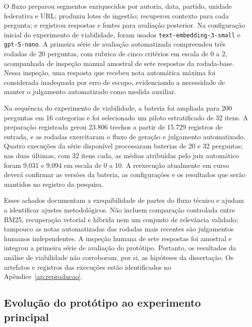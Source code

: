 O fluxo preparou segmentos enriquecidos por autoria, data, partido, unidade federativa e URL; produziu lotes de ingestão; recuperou contexto para cada pergunta; e registrou respostas e fontes para avaliação posterior. Na configuração inicial do experimento de viabilidade, foram usados \texttt{text-embedding-3-small} e \texttt{gpt-5-nano}. A primeira série de avaliação automatizada compreendeu três rodadas de 20 perguntas, com rubrica de cinco critérios em escala de 0 a 2, acompanhada de inspeção manual amostral de sete respostas da rodada-base. Nessa inspeção, uma resposta que recebeu nota automática máxima foi considerada inadequada por erro de escopo, evidenciando a necessidade de manter o julgamento automatizado como medida auxiliar.

Na sequência do experimento de viabilidade, a bateria foi ampliada para 200 perguntas em 16 categorias e foi selecionado um piloto estratificado de 32 itens. A preparação registrada gerou 23.806 trechos a partir de 15.729 registros de entrada, e as rodadas exercitaram o fluxo de geração e julgamento automatizado. Quatro execuções da série disponível processaram baterias de 20 e 32 perguntas; nas duas últimas, com 32 itens cada, as médias atribuídas pelo juiz automático foram 9,031 e 9,094 em escala de 0 a 10. A reexecução atualmente em curso deverá confirmar as versões da bateria, as configurações e os resultados que serão mantidos no registro da pesquisa.

Esses achados documentam a exequibilidade de partes do fluxo técnico e ajudam a identificar ajustes metodológicos. Não incluem comparação controlada entre BM25, recuperação vetorial e híbrida nem um conjunto de relevância validado; tampouco as notas automatizadas das rodadas mais recentes são julgamentos humanos independentes. A inspeção humana de sete respostas foi amostral e integrou a primeira série de avaliação do protótipo. Portanto, os resultados da análise de viabilidade não corroboram, por si, as hipóteses da dissertação. Os artefatos e registros das execuções estão identificados no Apêndice~\ref{ap:reproducao}.

\subsection{Evolução do protótipo ao experimento principal}

